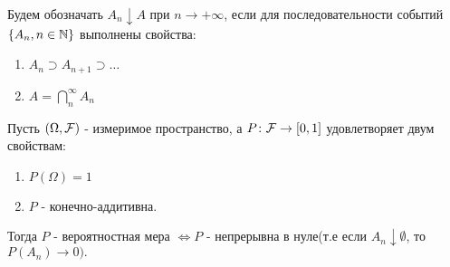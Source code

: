 \begin{definition}
	Будем обозначать $A_n \downarrow A$ при $n \to +\infty $, 
	если для последовательности событий $\left\{ A_n, n \in \mathbb{N} \right\}$ выполнены свойства: 

	\begin{enumerate}
		\item $A_n \supset A_{n+1} \supset \ldots$
		\item $A = \bigcap\limits_{n}^{\infty} A_n$
	\end{enumerate}
\end{definition}

\begin{theorem}
	Пусть $(\Omega, \mathcal{F})$ - измеримое пространство, 
	а $P\colon \mathcal{F} \rightarrow [0, 1]$ удовлетворяет двум свойствам:
	\begin{enumerate}
		\item $P(\Omega) = 1$
		\item $P$ - конечно-аддитивна. 
	\end{enumerate}
	Тогда $P$ - вероятностная мера $\Leftrightarrow P$ - непрерывна в нуле(т.е если $A_n  \downarrow \emptyset$, то $P(A_n) \rightarrow 0).$
\end{theorem}


